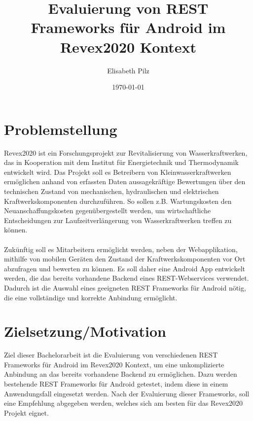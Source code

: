 \documentclass[a4paper,10pt,german,public]{INSOexpose}
\title{\centering Evaluierung von REST Frameworks für Android im Revex2020 Kontext \\}
\author{Elisabeth Pilz}
\date{\today}
\begin{document}
\maketitle

\section{Problemstellung}

Revex2020 ist ein Forschungsprojekt zur Revitalisierung von Wasserkraftwerken, das in Kooperation mit dem Institut für Energietechnik und Thermodynamik entwickelt wird. Das Projekt soll es Betreibern von Kleinwasserkraftwerken ermöglichen anhand von erfassten Daten aussagekräftige Bewertungen über den technischen Zustand von mechanischen, hydraulischen und elektrischen Kraftwerkskomponenten durchzuführen. So sollen z.B. Wartungskosten den Neuanschaffungskosten gegenübergestellt werden, um wirtschaftliche Entscheidungen zur Laufzeitverlängerung von Wasserkraftwerken treffen zu können.
\\\\
Zukünftig soll es Mitarbeitern ermöglicht werden, neben der Webapplikation, mithilfe von mobilen Geräten den Zustand der Kraftwerkskomponenten vor Ort abzufragen und bewerten zu können. Es soll daher eine Android App entwickelt werden, die das bereits vorhandene Backend eines REST-Webservices verwendet. Dadurch ist die Auswahl eines geeigneten REST Frameworks für Android nötig, die eine vollständige und korrekte Anbindung ermöglicht.

\section{Zielsetzung/Motivation}

Ziel dieser Bachelorarbeit ist die Evaluierung von verschiedenen REST Frameworks für Android im Revex2020 Kontext, um eine unkomplizierte Anbindung an das bereits vorhandene Backend zu ermöglichen. Dazu werden bestehende REST Frameworks für Android getestet, indem diese in einem Anwendungsfall eingesetzt werden. Nach der Evaluierung dieser Frameworks, soll eine Empfehlung abgegeben werden, welches sich am besten für das Revex2020 Projekt eignet.
\end{document}
